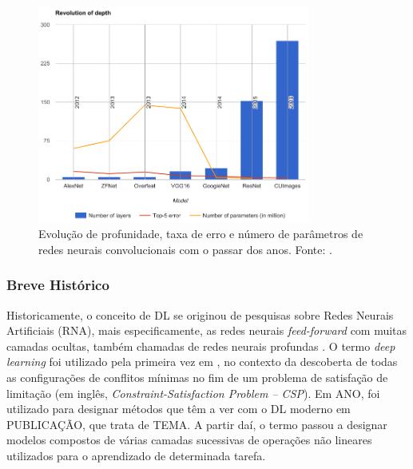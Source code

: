 \begin{figure}[!ht]
	\centering
	\includegraphics[width=0.8\textwidth]{img/compara_redes.png}
	\caption{Evolução de profunidade, taxa de erro e número de parâmetros de redes neurais convolucionais com o passar dos anos. Fonte: \cite{mediumcnn}.}
	\label{fig:compara_redes}
\end{figure}

\subsubsection{Breve Histórico}

Historicamente, o conceito de DL se originou de pesquisas sobre Redes Neurais Artificiais (RNA), mais especificamente, as redes neurais \emph{feed-forward} com muitas camadas ocultas, também chamadas de redes neurais profundas \cite{deng2014deep}. O termo \emph{deep learning} foi utilizado pela primeira vez em \cite{dechter1986learning}, no contexto da descoberta de todas as configurações de conflitos mínimas no fim de um problema de satisfação de limitação (em inglês, \emph{Constraint-Satisfaction Problem -- CSP}). Em ANO, foi utilizado para designar métodos que têm a ver com o DL moderno em PUBLICAÇÃO, que trata de TEMA. A partir daí, o termo passou a designar modelos compostos de várias camadas sucessivas de operações não lineares utilizados para o aprendizado de determinada tarefa.

